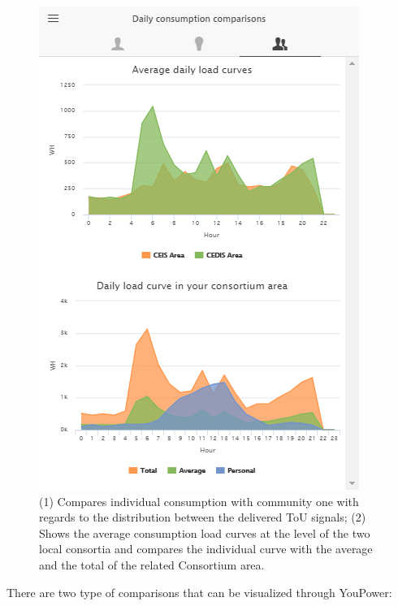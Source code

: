 \begin{figure}
\begin{center}
\begin{minipage}[htb]{0.45\linewidth}
         \includegraphics[width=1\linewidth]{img/benchmark.png}
        \end{minipage}
      \end{center}
      \caption{(1) Compares individual consumption with community one with regards to the distribution between the delivered ToU signals; (2) Shows the average consumption load curves at the level of the two local consortia and compares the individual curve with the average and the total of the related Consortium area.
}
\label{fig:comparison}
\end{figure}
There are two type of comparisons that can be visualized through YouPower:
